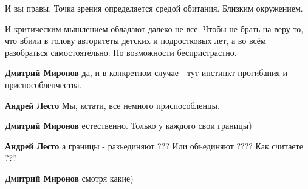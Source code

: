 \begin{itemize}
\begin{itemize}
И вы правы. Точка зрения определяется средой обитания. Близким окружением.

И критическим мышлением обладают далеко не все. Чтобы не брать на веру то, что
вбили в голову авторитеты детских и подростковых лет, а во всём разобраться
самостоятельно. По возможности беспристрастно.

 
\textbf{Дмитрий Миронов} да, и в конкретном случае - тут инстинкт прогибания и приспособленчества.

 
\textbf{Андрей Лесто} Мы, кстати, все немного приспособленцы.

 
\textbf{Дмитрий Миронов} естественно.
Только у каждого свои границы)

 
\textbf{Андрей Лесто} а границы - разъединяют ??? Или объединяют ???? Как считаете ???

 
\textbf{Дмитрий Миронов} смотря какие)

\end{itemize}

 

\end{itemize}
